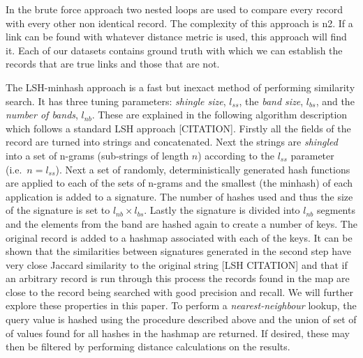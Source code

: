 \documentclass{llncs}
\begin{document}
In the brute force approach two nested loops are used to compare every 
record with every other non identical record. The complexity of this 
approach is n2. If a link can be found with whatever distance metric is 
used, this approach will find it.
Each of our datasets contains ground truth with which we can establish
the records that are true links and those that are not. 

The LSH-minhash approach is a fast but inexact method of performing similarity search. It has three tuning parameters:
\emph{shingle size}, $l_{ss}$, the \emph{band size}, $l_{bs}$, and the
\emph{number of bands}, $l_{nb}$. These are explained in the following algorithm description which follows a standard LSH approach [CITATION].
Firstly all the fields of the record are turned into strings and 
concatenated. Next the strings are \emph{shingled} into a set of
n-grams (sub-strings of length $n$) according to the $l_{ss}$
parameter (i.e.\ $n = l_{ss}$). Next a set of randomly, 
deterministically generated hash functions are applied to each of the
sets of n-grams and the smallest (the minhash) of each application is
added to a signature. The number of hashes used and thus the size of
the signature is set to $l_{nb} \times l_{bs}$.
Lastly the signature is divided into $l_{nb}$ segments and the elements from the band are hashed again to create a number of keys.
The original record is added to a hashmap associated with each of the keys. It can be shown that the similarities between signatures generated in the second step have very close Jaccard similarity to the original string [LSH CITATION] and that if an arbitrary record is run through
this process the records found in the map are close to the record being searched with good precision and recall. We will further explore these properties in this paper.
To perform a {\textit{nearest-neighbour}} lookup, the query value is hashed using the procedure described above and the union of set of of values found for all hashes in the hashmap are returned. If desired, these may then be filtered by performing distance calculations on the results.
\end{document}
